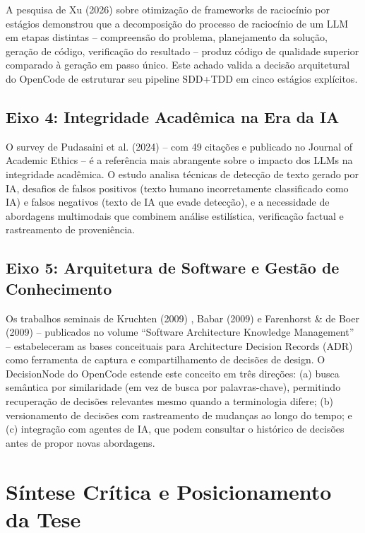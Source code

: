 \documentclass[12pt,a4paper,sumario=tradicional,openany]{abntex2}
\begin{document}
A pesquisa de Xu (2026) \cite{xu2026optimisation} sobre otimização de frameworks de raciocínio por estágios demonstrou que a decomposição do processo de raciocínio de um LLM em etapas distintas -- compreensão do problema, planejamento da solução, geração de código, verificação do resultado -- produz código de qualidade superior comparado à geração em passo único. Este achado valida a decisão arquitetural do OpenCode de estruturar seu pipeline SDD+TDD em cinco estágios explícitos.

\subsection{Eixo 4: Integridade Acadêmica na Era da IA}

O survey de Pudasaini et al. (2024) \cite{pudasaini2024survey} -- com 49 citações e publicado no Journal of Academic Ethics -- é a referência mais abrangente sobre o impacto dos LLMs na integridade acadêmica. O estudo analisa técnicas de detecção de texto gerado por IA, desafios de falsos positivos (texto humano incorretamente classificado como IA) e falsos negativos (texto de IA que evade detecção), e a necessidade de abordagens multimodais que combinem análise estilística, verificação factual e rastreamento de proveniência.

\subsection{Eixo 5: Arquitetura de Software e Gestão de Conhecimento}

Os trabalhos seminais de Kruchten (2009) \cite{kruchten2009documentation}, Babar (2009) \cite{babar2009supporting} e Farenhorst \& de Boer (2009) \cite{farenhorst2009knowledge} -- publicados no volume ``Software Architecture Knowledge Management'' -- estabeleceram as bases conceituais para Architecture Decision Records (ADR) como ferramenta de captura e compartilhamento de decisões de design. O DecisionNode do OpenCode estende este conceito em três direções: (a) busca semântica por similaridade (em vez de busca por palavras-chave), permitindo recuperação de decisões relevantes mesmo quando a terminologia difere; (b) versionamento de decisões com rastreamento de mudanças ao longo do tempo; e (c) integração com agentes de IA, que podem consultar o histórico de decisões antes de propor novas abordagens.

\section{Síntese Crítica e Posicionamento da Tese}
\end{document}
